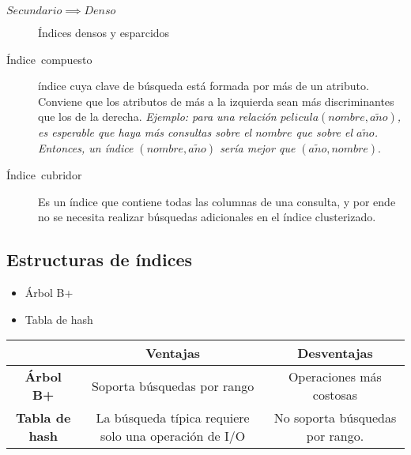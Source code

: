 \documentclass[a4paper, twoside]{article}
\begin{document}
\noindent \begin{center}
$Secundario\implies Denso$
\par\end{center}

\begin{figure}[H]

\protect\caption{Índices densos y esparcidos}


\end{figure}

\begin{description}
\item [{Índice~compuesto}] índice cuya clave de búsqueda está formada
por más de un atributo. Conviene que los atributos de más a la izquierda
sean más discriminantes que los de la derecha. \emph{Ejemplo: para
una relación $pelicula(nombre,a\tilde{n}o)$, es esperable que haya
más consultas sobre el $nombre$ que sobre el $a\tilde{n}o$. Entonces,
un índice $(nombre,a\tilde{n}o)$ sería mejor que $(a\tilde{n}o,nombre).$}
\item [{Índice~cubridor}] Es un índice que contiene todas las columnas
de una consulta, y por ende no se necesita realizar búsquedas adicionales
en el índice clusterizado.
\end{description}

\subsection{Estructuras de índices}
\begin{itemize}
\item Árbol B+
\item Tabla de hash
\end{itemize}
\noindent \begin{center}
\begin{tabular}{|c|c|c|}
\hline 
 & \textbf{Ventajas} & \textbf{Desventajas}\\
\hline 
\hline 
\textbf{Árbol B+} & Soporta búsquedas por rango & Operaciones más costosas\\
\hline 
\textbf{Tabla de hash} & La búsqueda típica requiere solo una operación de I/O & No soporta búsquedas por rango. \\
\hline 
\end{tabular}
\par\end{center}
\end{document}
